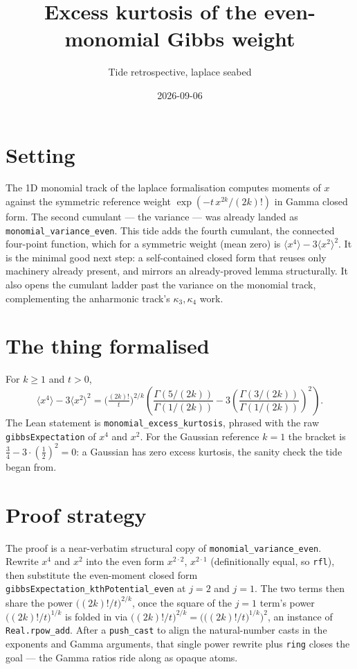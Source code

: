 \documentclass[11pt]{article}
\title{Excess kurtosis of the even-monomial Gibbs weight}
\author{Tide retrospective, laplace seabed}
\date{2026-09-06}
\begin{document}
\sloppy
\maketitle
\section{Setting}
The 1D monomial track of the laplace formalisation computes moments of $x$ against the symmetric
reference weight $\exp(-t\,x^{2k}/(2k)!)$ in Gamma closed form. The second cumulant --- the variance
--- was already landed as \texttt{monomial\_variance\_even}. This tide adds the fourth cumulant, the
connected four-point function, which for a symmetric weight (mean zero) is $\langle x^4\rangle -
3\langle x^2\rangle^2$. It is the minimal good next step: a self-contained closed form that reuses
only machinery already present, and mirrors an already-proved lemma structurally. It also opens the
cumulant ladder past the variance on the monomial track, complementing the anharmonic track's
$\kappa_3,\kappa_4$ work.
\section{The thing formalised}
For $k \ge 1$ and $t > 0$,
\[
  \langle x^4\rangle - 3\langle x^2\rangle^2
  = \Big(\tfrac{(2k)!}{t}\Big)^{2/k}
    \left(\frac{\Gamma(5/(2k))}{\Gamma(1/(2k))}
      - 3\left(\frac{\Gamma(3/(2k))}{\Gamma(1/(2k))}\right)^{2}\right).
\]
The Lean statement is \texttt{monomial\_excess\_kurtosis}, phrased with the raw
\texttt{gibbsExpectation} of $x^4$ and $x^2$. For the Gaussian reference $k=1$ the bracket is
$\tfrac34 - 3\cdot(\tfrac12)^2 = 0$: a Gaussian has zero excess kurtosis, the sanity check the tide
began from.
\section{Proof strategy}
The proof is a near-verbatim structural copy of \texttt{monomial\_variance\_even}. Rewrite $x^4$ and
$x^2$ into the even form $x^{2\cdot 2}$, $x^{2\cdot 1}$ (definitionally equal, so \texttt{rfl}), then
substitute the even-moment closed form \texttt{gibbsExpectation\_kthPotential\_even} at $j=2$ and
$j=1$. The two terms then share the power $\big((2k)!/t\big)^{2/k}$, once the square of the
$j=1$ term's power $\big((2k)!/t\big)^{1/k}$ is folded in via
$\big((2k)!/t\big)^{2/k} = \big(\big((2k)!/t\big)^{1/k}\big)^2$, an instance of \texttt{Real.rpow\_add}.
After a \texttt{push\_cast} to align the natural-number casts in the exponents and Gamma arguments,
that single power rewrite plus \texttt{ring} closes the goal --- the Gamma ratios ride along as
opaque atoms.
\end{document}
